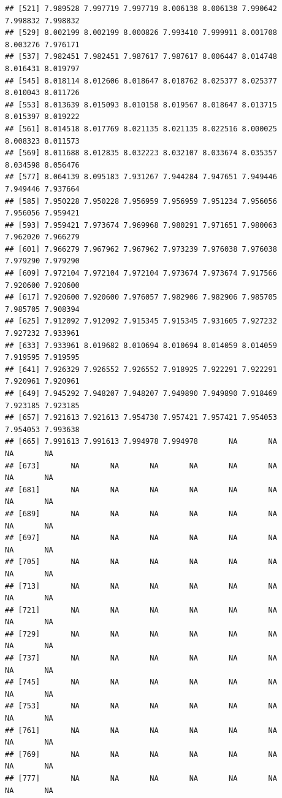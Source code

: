 \documentclass[
]{article}
\begin{document}
\begin{verbatim}
## [521] 7.989528 7.997719 7.997719 8.006138 8.006138 7.990642 7.998832 7.998832
## [529] 8.002199 8.002199 8.000826 7.993410 7.999911 8.001708 8.003276 7.976171
## [537] 7.982451 7.982451 7.987617 7.987617 8.006447 8.014748 8.016431 8.019797
## [545] 8.018114 8.012606 8.018647 8.018762 8.025377 8.025377 8.010043 8.011726
## [553] 8.013639 8.015093 8.010158 8.019567 8.018647 8.013715 8.015397 8.019222
## [561] 8.014518 8.017769 8.021135 8.021135 8.022516 8.000025 8.008323 8.011573
## [569] 8.011688 8.012835 8.032223 8.032107 8.033674 8.035357 8.034598 8.056476
## [577] 8.064139 8.095183 7.931267 7.944284 7.947651 7.949446 7.949446 7.937664
## [585] 7.950228 7.950228 7.956959 7.956959 7.951234 7.956056 7.956056 7.959421
## [593] 7.959421 7.973674 7.969968 7.980291 7.971651 7.980063 7.962020 7.966279
## [601] 7.966279 7.967962 7.967962 7.973239 7.976038 7.976038 7.979290 7.979290
## [609] 7.972104 7.972104 7.972104 7.973674 7.973674 7.917566 7.920600 7.920600
## [617] 7.920600 7.920600 7.976057 7.982906 7.982906 7.985705 7.985705 7.908394
## [625] 7.912092 7.912092 7.915345 7.915345 7.931605 7.927232 7.927232 7.933961
## [633] 7.933961 8.019682 8.010694 8.010694 8.014059 8.014059 7.919595 7.919595
## [641] 7.926329 7.926552 7.926552 7.918925 7.922291 7.922291 7.920961 7.920961
## [649] 7.945292 7.948207 7.948207 7.949890 7.949890 7.918469 7.923185 7.923185
## [657] 7.921613 7.921613 7.954730 7.957421 7.957421 7.954053 7.954053 7.993638
## [665] 7.991613 7.991613 7.994978 7.994978       NA       NA       NA       NA
## [673]       NA       NA       NA       NA       NA       NA       NA       NA
## [681]       NA       NA       NA       NA       NA       NA       NA       NA
## [689]       NA       NA       NA       NA       NA       NA       NA       NA
## [697]       NA       NA       NA       NA       NA       NA       NA       NA
## [705]       NA       NA       NA       NA       NA       NA       NA       NA
## [713]       NA       NA       NA       NA       NA       NA       NA       NA
## [721]       NA       NA       NA       NA       NA       NA       NA       NA
## [729]       NA       NA       NA       NA       NA       NA       NA       NA
## [737]       NA       NA       NA       NA       NA       NA       NA       NA
## [745]       NA       NA       NA       NA       NA       NA       NA       NA
## [753]       NA       NA       NA       NA       NA       NA       NA       NA
## [761]       NA       NA       NA       NA       NA       NA       NA       NA
## [769]       NA       NA       NA       NA       NA       NA       NA       NA
## [777]       NA       NA       NA       NA       NA       NA       NA       NA

\end{verbatim}
\end{document}
